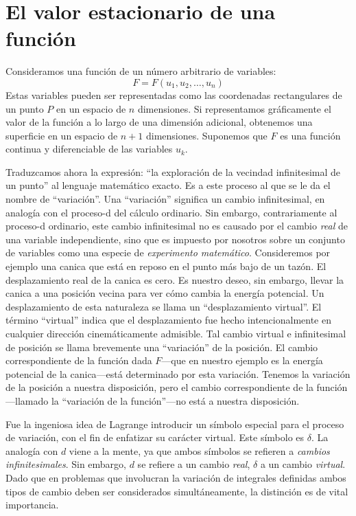 \documentclass[12pt,a4paper]{book}
\begin{document}
\section{El valor estacionario de una función}

Consideramos una función de un número arbitrario de variables:
\begin{equation}
F = F(u_1, u_2, \ldots, u_n) \tag{22.1}
\end{equation}
Estas variables pueden ser representadas como las coordenadas rectangulares de un punto $P$ en un espacio de $n$ dimensiones. Si representamos gráficamente el valor de la función a lo largo de una dimensión adicional, obtenemos una superficie en un espacio de $n + 1$ dimensiones. Suponemos que $F$ es una función continua y diferenciable de las variables $u_k$.

Traduzcamos ahora la expresión: ``la exploración de la vecindad infinitesimal de un punto'' al lenguaje matemático exacto. Es a este proceso al que se le da el nombre de ``variación''. Una ``variación'' significa un cambio infinitesimal, en analogía con el proceso-d del cálculo ordinario. Sin embargo, contrariamente al proceso-d ordinario, este cambio infinitesimal no es causado por el cambio \textit{real} de una variable independiente, sino que es impuesto por nosotros sobre un conjunto de variables como una especie de \textit{experimento matemático}. Consideremos por ejemplo una canica que está en reposo en el punto más bajo de un tazón. El desplazamiento real de la canica es cero. Es nuestro deseo, sin embargo, llevar la canica a una posición vecina para ver cómo cambia la energía potencial. Un desplazamiento de esta naturaleza se llama un ``desplazamiento virtual''. El término ``virtual'' indica que el desplazamiento fue hecho intencionalmente en cualquier dirección cinemáticamente admisible. Tal cambio virtual e infinitesimal de posición se llama brevemente una ``variación'' de la posición. El cambio correspondiente de la función dada $F$---que en nuestro ejemplo es la energía potencial de la canica---está determinado por esta variación. Tenemos la variación de la posición a nuestra disposición, pero el cambio correspondiente de la función---llamado la ``variación de la función''---no está a nuestra disposición.

Fue la ingeniosa idea de Lagrange introducir un símbolo especial para el proceso de variación, con el fin de enfatizar su carácter virtual. Este símbolo es $\delta$. La analogía con $d$ viene a la mente, ya que ambos símbolos se refieren a \textit{cambios infinitesimales}. Sin embargo, $d$ se refiere a un cambio \textit{real}, $\delta$ a un cambio \textit{virtual}. Dado que en problemas que involucran la variación de integrales definidas ambos tipos de cambio deben ser considerados simultáneamente, la distinción es de vital importancia.
\end{document}
